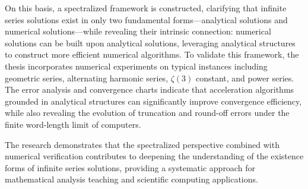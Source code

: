 On this basis, a spectralized framework is constructed, clarifying that infinite series solutions exist in only two fundamental forms---analytical solutions and numerical solutions---while revealing their intrinsic connection: numerical solutions can be built upon analytical solutions, leveraging analytical structures to construct more efficient numerical algorithms. To validate this framework, the thesis incorporates numerical experiments on typical instances including geometric series, alternating harmonic series, $\zeta(3)$ constant, and power series. The error analysis and convergence charts indicate that acceleration algorithms grounded in analytical structures can significantly improve convergence efficiency, while also revealing the evolution of truncation and round-off errors under the finite word-length limit of computers.

The research demonstrates that the spectralized perspective combined with numerical verification contributes to deepening the understanding of the existence forms of infinite series solutions, providing a systematic approach for mathematical analysis teaching and scientific computing applications.


\clearpage
